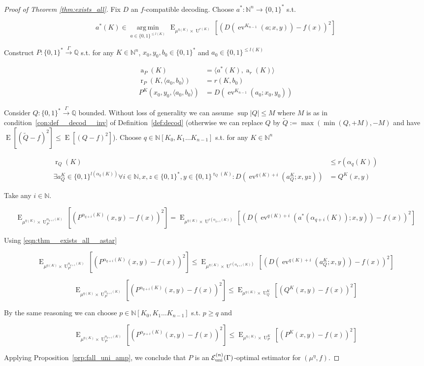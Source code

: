 \documentclass{article}
\numberwithin{equation}{section}
\theoremstyle{definition}
\theoremstyle{plain}
\newcommand{\Bool}{\{0,1\}}
\newcommand{\Words}{{\Bool^*}}
\DeclareMathOperator{\E}{E}
\DeclareMathOperator{\Ev}{ev}
\DeclareMathOperator{\R}{r}
\DeclareMathOperator{\A}{a}
\DeclareMathOperator{\Un}{U}
\newcommand{\Argmin}[1]{\underset{#1}{\operatorname{arg\,min}}\,}
\newcommand{\Nats}{\mathbb{N}}
\newcommand{\Rats}{\mathbb{Q}}
\newcommand{\NatPoly}{\Nats[K_0, K_1 \ldots K_{n-1}]}
\newcommand{\Abs}[1]{\lvert #1 \rvert}
\newcommand{\Chev}[1]{\langle #1 \rangle}
\newcommand{\Fall}{\mathcal{E}}
\newcommand{\BoolR}[1]{\Bool^{\R_{#1}(K)}}
\newcommand{\FallU}{{\Fall_{\textnormal{uni}}^{(n)}}}
\newcommand{\Scheme}{\xrightarrow{\Gamma}}
\begin{document}
\begin{proof}[Proof of Theorem \ref{thm:exists_all}]

Fix ${D}$ an ${f}$-compatible decoding. Choose ${a^*: \Nats^n \rightarrow \Words}$ s.t.

\begin{equation}
\label{eqn:thm__exists_all__astar}
a^*(K) \in \Argmin{a \in \Bool^{\leq l(K)}} \E_{\mu^{\eta(K)} \times \Un^{r(K)}}[(D(\Ev^{K_{n-1}}(a;x,y))-f(x))^2]
\end{equation} 

Construct ${P: \Words \Scheme \Rats}$ s.t. for any ${K \in \Nats^n}$, ${x_0,y_0,b_0 \in \Words}$ and ${a_0 \in \Bool^{\leq l(K)}}$

\begin{align}
\A_P(K) &= \Chev{a^*(K),\A_r(K)}\\
\R_P(K,\Chev{a_0,b_0}) &= r(K,b_0) \\
P^K(x_0,y_0,\Chev{a_0,b_0}) &= D(\Ev^{K_{n-1}}(a_0;x_0,y_0))
\end{align}

Consider ${Q: \Words \Scheme \Rats}$ bounded. Without loss of generality we can assume ${\sup \Abs{Q} \leq M}$ where ${M}$ is as in condition~\ref{con:def__decod__inv} of Definition~\ref{def:decod} (otherwise we can replace ${Q}$ by ${\tilde{Q}:=\max(\min(Q,+M),-M)}$ and have ${\E[(\tilde{Q}-f)^2]\leq\E[(Q-f)^2]}$). Choose ${q \in \NatPoly}$ s.t. for any ${K \in \Nats^n}$

\begin{align}
\label{eqn:thm__exists_all__q_rnd}\R_Q(K) &\leq r(\alpha_q(K)) \\
\label{eqn:thm__exists_all__q_adv}\exists a_Q^K \in \Bool^{l(\alpha_q(K))} \forall i \in \Nats, x,z \in \Words, y \in \BoolR{Q}: D(\Ev^{q(K)+i}(a_Q^K;x,yz))&=Q^K(x,y)
\end{align}

Take any ${i \in \Nats}$.

\[\E_{ \mu^{\eta(K)} \times \Un_P^{\alpha_{q+i}(K)}}[(P^{\alpha_{q+i}(K)}(x,y)-f(x))^2]=\E_{ \mu^{\eta(K)} \times \Un^{r(\alpha_{q+i}(K))}}[(D(\Ev^{q(K)+i}(a^*(\alpha_{q+i}(K));x,y))-f(x))^2]\]

Using \ref{eqn:thm__exists_all__astar}

\[\E_{ \mu^{\eta(K)} \times \Un_P^{\alpha_{q+i}(K)}}[(P^{\alpha_{q+i}(K)}(x,y)-f(x))^2] \leq \E_{\mu^{\eta(K)} \times \Un^{r(\alpha_{q+i}(K))}}[(D(\Ev^{q(K)+i}(a_Q^K;x,y))-f(x))^2]\]

\[\E_{ \mu^{\eta(K)} \times \Un_P^{\alpha_{q+i}(K)}}[(P^{\alpha_{q+i}(K)}(x,y)-f(x))^2] \leq \E_{\mu^{\eta(K)} \times \Un_Q^K}[(Q^K(x,y)-f(x))^2]\]

By the same reasoning we can choose ${p \in \NatPoly}$ s.t. ${p \geq q}$ and

\[\E_{ \mu^{\eta(K)} \times \Un_P^{\alpha_{p+i}(K)}}[(P^{\alpha_{p+i}(K)}(x,y)-f(x))^2] \leq \E_{\mu^{\eta(K)} \times \Un_P^K}[(P^K(x,y)-f(x))^2]\]

Applying Proposition~\ref{prp:fall_uni_amp}, we conclude that ${P}$ is an ${\FallU(\Gamma)}$-optimal estimator for ${(\mu^\eta,f)}$.
%
\end{proof}
\end{document}
